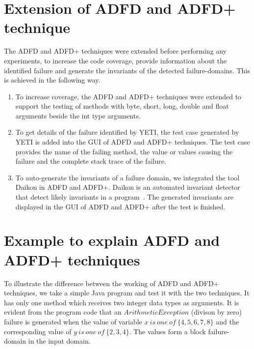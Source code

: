 \documentclass[runningheads,a4paper]{llncs}
\begin{document}


\section{Extension of ADFD and ADFD+ technique}
The ADFD and ADFD+ techniques were extended before performing any experiments, to increase the code coverage, provide information about the identified failure and generate the invariants of the detected failure-domains. This is achieved in the following way.
\begin{enumerate}

\item To increase coverage, the ADFD and ADFD+ techniques were extended to support the testing of methods with byte, short, long, double and float arguments beside the int type arguments.

\item To get details of the failure identified by YETI, the test case generated by YETI is added into the GUI of ADFD and ADFD+ techniques. The test case provides the name of the failing method, the value or values causing the failure and the complete stack trace of the failure. 

\item To auto-generate the invariants of a failure domain, we integrated the tool Daikon in ADFD and ADFD+. Daikon is an automated invariant detector that detect likely invariants in a program~\cite{ernst2007daikon}. The generated invariants are displayed in the GUI of ADFD and ADFD+ after the test is finished. 

\end{enumerate}

\section{Example to explain ADFD and ADFD+ techniques}
To illustrate the difference between the working of ADFD and ADFD+ techniques, we take a simple Java program and test it with the two techniques. It has only one method which receives two integer data types as arguments. It is evident from the program code that an $ArithmeticException$ (divison by zero) failure is generated when the value of variable $x~is~one~of~\{4, 5, 6, 7, 8\}$ and the corresponding value of $y~is~one~of~\{2, 3, 4\}$. The values form a block failure-domain in the input domain. 
\end{document}
